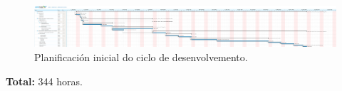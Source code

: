 \begin{figure}[htbp]
  \centering
  \includegraphics[trim=0 0 112cm 0,clip=true,scale=0.70,keepaspectratio=true]{./imagenes/desenvolvemento.png}
  \caption{Planificación inicial do ciclo de desenvolvemento.}
  \label{figura:PlanificacionInicialDesenvolvemento}
 \end{figure}

 \textbf{Total:} 344 horas.
